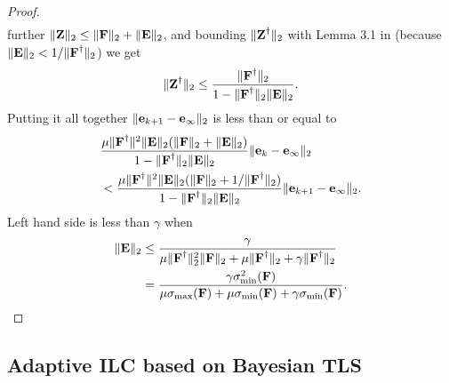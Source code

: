 \begin{proof}
\begin{align}
\end{align}
%
further $\|\boldsymbol{\mathrm{Z}}\|_2 \leq \|\boldsymbol{\mathrm{F}}\|_2 + \|\boldsymbol{\mathrm{E}}\|_2$, and bounding $\|\boldsymbol{\mathrm{Z}}^{\dagger}\|_2$ with Lemma 3.1 in \cite{Wedin73} (because $\|\boldsymbol{\mathrm{E}}\|_2 < 1/\|\boldsymbol{\mathrm{F}}^{\dagger}\|_2$) we get
%
\begin{align}
\|\boldsymbol{\mathrm{Z}}^{\dagger}\|_2 \leq \frac{\|\boldsymbol{\mathrm{F}}^{\dagger}\|_2}{1 - \|\boldsymbol{\mathrm{F}}^{\dagger}\|_2\|\boldsymbol{\mathrm{E}}\|_2}.
\end{align}
%
Putting it all together $\|\boldsymbol{\mathrm{e}}_{k+1} - \boldsymbol{\mathrm{e}}_{\infty}\|_2$ is less than or equal to
%
\begin{align}
& \frac{\mu \|\boldsymbol{\mathrm{F}}^{\dagger}\|^{2}\|\boldsymbol{\mathrm{E}}\|_2(\|\boldsymbol{\mathrm{F}}\|_2 + \|\boldsymbol{\mathrm{E}}\|_2)}{1 - \|\boldsymbol{\mathrm{F}}^{\dagger}\|_2\|\boldsymbol{\mathrm{E}}\|_2}\|\boldsymbol{\mathrm{e}}_{k} - \boldsymbol{\mathrm{e}}_{\infty}\|_2 \\
&<  \frac{\mu \|\boldsymbol{\mathrm{F}}^{\dagger}\|^{2}\|\boldsymbol{\mathrm{E}}\|_2(\|\boldsymbol{\mathrm{F}}\|_2 + 1/\|\boldsymbol{\mathrm{F}}^{\dagger}\|_2)}{1 - \|\boldsymbol{\mathrm{F}}^{\dagger}\|_2\|\boldsymbol{\mathrm{E}}\|_2}\|\boldsymbol{\mathrm{e}}_{k+1} - \boldsymbol{\mathrm{e}}_{\infty}\|_2.
\end{align}
%
Left hand side is less than $\gamma$ when
%
\begin{align}
\|\boldsymbol{\mathrm{E}}\|_2 &\leq \frac{\gamma}{\mu\|\boldsymbol{\mathrm{F}}^{\dagger}\|_2^{2}\|\boldsymbol{\mathrm{F}}\|_2 + \mu\|\boldsymbol{\mathrm{F}}^{\dagger}\|_2 + \gamma\|\boldsymbol{\mathrm{F}}^{\dagger}\|_2} \\
&= \frac{\gamma\sigma_{\mathrm{min}}^{2}(\boldsymbol{\mathrm{F}})}{\mu\sigma_{\mathrm{max}}(\boldsymbol{\mathrm{F}}) + \mu\sigma_{\mathrm{min}}(\boldsymbol{\mathrm{F}}) + \gamma\sigma_{\mathrm{min}}(\boldsymbol{\mathrm{F}})}.
\end{align}

%
\end{proof}
%
%
%
\subsection{Adaptive ILC based on Bayesian TLS}\label{adaptiveILC}

